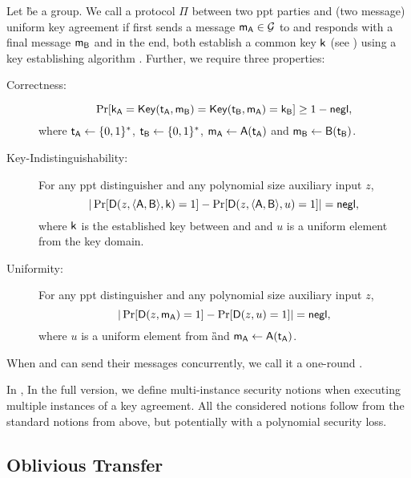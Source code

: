 \begin{definition} 
Let \G be a group.
We call a protocol $\Pi$ between two ppt parties \A and \B (two message) uniform key agreement if \A first sends a message $\mathsf{m}_\mathsf{A}\in\mathcal{G}$ to \B and \B responds with a final message $\mathsf{m}_\mathsf{B}$ and in the end, both establish a common key $\mathsf{k}$ (see ) using a key establishing algorithm \EK. Further, we require three properties:
\begin{description}
\item[Correctness:]
$$
\Pr[\mathsf{k}_\mathsf{A}=\mathsf{Key}(\mathsf{t}_\mathsf{A},\mathsf{m}_\mathsf{B})=\mathsf{Key}(\mathsf{t}_\mathsf{B},\mathsf{m}_\mathsf{A})=\mathsf{k}_\mathsf{B}]\geq 1-\mathsf{negl},
$$
where $\mathsf{t}_\mathsf{A}\leftarrow\{0,1\}^*$, $\mathsf{t}_\mathsf{B}\leftarrow\{0,1\}^*$, $\mathsf{m}_\mathsf{A}\leftarrow\mathsf{A}(\mathsf{t}_\mathsf{A})$ and $\mathsf{m}_\mathsf{B}\leftarrow\mathsf{B}(\mathsf{t}_\mathsf{B})$.
\item [Key-Indistinguishability:] For any ppt distinguisher \D and any polynomial size auxiliary input $z$,
$$ 
|\Pr[\mathsf D(z,\langle \mathsf{A},\mathsf{B}\rangle, \mathsf{k})=1]-\Pr[\mathsf D(z,\langle \mathsf{A},\mathsf{B}\rangle, u)=1]|=\mathsf{negl},
$$
where $\mathsf{k}$ is the established key between \A and \B and $u$ is a uniform element from the key domain.
\item [Uniformity:] For any ppt distinguisher \D and any polynomial size auxiliary input $z$, 
$$
|\Pr[\mathsf D(z,\mathsf{m}_\mathsf{A})=1]-\Pr[\mathsf D(z,u)=1]|=\mathsf{negl},
$$
where $u$ is a uniform element from \G and $\mathsf{m}_\mathsf{A}\leftarrow\mathsf{A}(\mathsf{t}_\mathsf{A})$.
\end{description}
When \A and \B can send their messages concurrently, we call it a one-round \UKA.
\end{definition}

\iffullversion
In ,
\else
In the full version,
\fi
 we define multi-instance security notions when executing multiple instances of a key agreement. All the considered notions follow from the standard notions from above, but potentially with a polynomial security loss.


\subsection{Oblivious Transfer}



